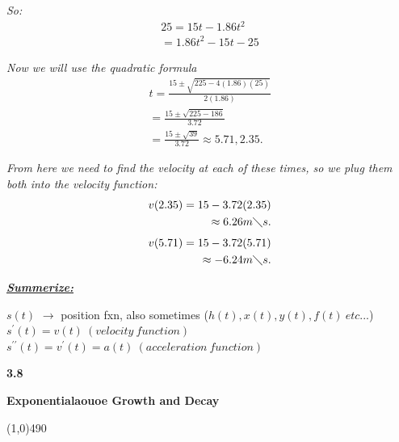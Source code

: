 \documentclass{report}
\begin{document}
    \bigbreak \noindent
    \textit{So:}
    \begin{align*}
      25 = 15t-1.86t^{2} \\ 
      = 1.86t^{2} -15t -25
    \end{align*}

    \bigbreak \noindent 
    \textit{Now we will use the quadratic formula}
    \begin{align*}
      t = \frac{15\pm \sqrt{225 - 4(1.86)(25)}}{2(1.86)} \\
      = \frac{15\pm \sqrt{225-186}}{3.72} \\
      =  \frac{15\pm \sqrt{39}}{3.72} 
      \approx 5.71, 2.35
    .\end{align*}
      
    \bigbreak \noindent 

    \bigbreak \noindent 
    \textit{From here we need to find the velocity at each of these times, so we plug them both into the velocity function:}
    \begin{align*}
      v(2.35) = 15-3.72(2.35) \\
      \approx 6.26 m \diagdown s 
    .\end{align*}
    \begin{align*}
      v(5.71) = 15-3.72(5.71) \\
      \approx - 6.24 m \diagdown s 
    .\end{align*}

    \bigbreak \noindent 
    \textbf{\textit{\underline{Summerize:}}}
    \begin{center}
      $s(t)$  $\longrightarrow$ position fxn, also sometimes ($h(t), x(t), y(t), f(t)\ etc...$) 
      \smallbreak \noindent
      $s^{\prime}(t) = v(t)\ (velocity\ function)$ 
      \smallbreak \noindent
      $s^{\prime\prime}(t) = v^{\prime}(t) = a(t)\ (acceleration\ function)$
    \end{center}

    \pagebreak \bigbreak \noindent
    \begin{Large}
        \begin{mdframed}
            \begin{center}
                \textbf{3.8}
            \end{center}
        \end{mdframed}
    \end{Large}
    \begin{Large}
        \begin{center}
            \textbf{Exponentialaouoe Growth and Decay}
        \end{center}
    \end{Large}
    \line(1,0){490}
    
    \bigbreak \noindent \bigbreak \noindent \bigbreak \noindent 
    


  
\end{document}

